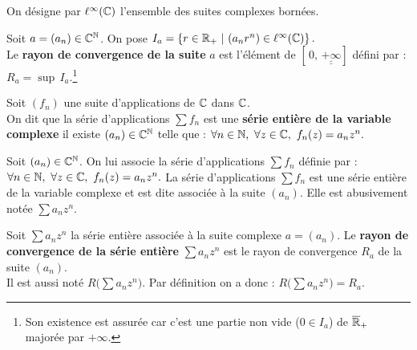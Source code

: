 \vspace{0.8cm}
\begin{center}
On désigne par \(\ell^\infty(\mathbb{C})\) l'ensemble des suites complexes bornées.
\end{center}
\vspace{0.5cm}

Soit \(a=(a_n)\in \mathbb{C}^{\mathbb{N}}\). On pose \(I_a=\left\{ r\in \mathbb{R}_+ \ | \ (a_nr^n)\in \ell^\infty(\mathbb{C}) \right\}. \)\vspace{0.2cm}\\
Le \textbf{rayon de convergence de la suite} \(a\) est l'élément de \([\,0,\,\underline{\underline{+\infty} } ]\) défini par : \(R_a= \sup\, I_a.\)\footnote{Son existence est assurée car c'est une partie non vide (\(0\in I_a\)) de \(\overline{\mathbb{R}}_+\) majorée par \(+\infty\).}

\vspace{1.4cm}

Soit \((f_n)\) une suite d'applications de \(\mathbb{C}\) dans \(\mathbb{C}\).\\
On dit que la série d'applications \(\sum f_n\) est une \textbf{série entière de la variable complexe} \ssi il existe \((a_n)\in \mathbb{C}^{\mathbb{N}} \) telle que : \(\forall n\in \NN,\ \forall z\in \CC,\ f_n(z)=a_nz^n.  \)\vspace{0.2cm}\\
\begin{small}
    Soit \((a_n)\in \mathbb{C}^{\mathbb{N}}\). On lui associe la série d'applications \(\sum f_n\) définie par : \(\forall n \in \NN,\ \forall z\in \CC, \ f_n(z)=a_nz^n.\) La série d'applications \(\sum f_n\) est une série entière de la variable complexe et est dite associée à la suite \((a_n)\). Elle est abusivement notée \(\sum a_nz^n\).    
\end{small}

\newpage

Soit \(\sum a_nz^n\) la série entière associée à la suite complexe \(a=(a_n)\). Le \textbf{rayon de convergence de la série entière} \(\sum a_n z^n\) est le rayon de convergence \(R_a\) de la suite \((a_n)\)\vspace{0.1cm}.\\
Il est aussi noté \(R\bigl(\sum a_nz^n\bigr)\). Par définition on a donc : \(R\bigl(\sum a_nz^n\bigr)=R_a.\)

\vspace{1.2cm}

